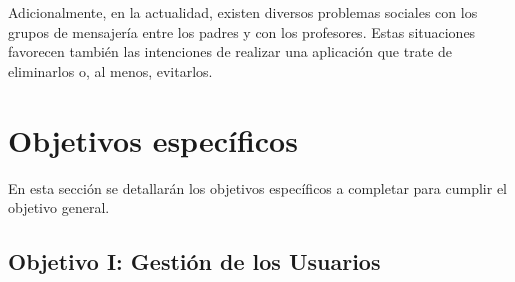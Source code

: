 Adicionalmente, en la actualidad, existen diversos problemas sociales con los grupos de mensajería entre los padres y con los profesores. Estas situaciones favorecen también las intenciones de realizar una aplicación que trate de eliminarlos o, al menos, evitarlos.


\section{Objetivos específicos}

En esta sección se detallarán los objetivos específicos a completar para cumplir el objetivo general.

%
%
%
%

\subsection{Objetivo I: Gestión de los Usuarios}

